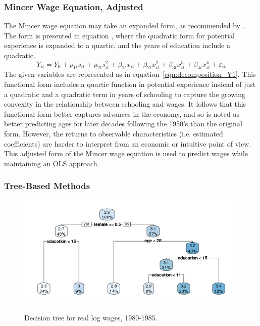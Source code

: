 \documentclass[notitlepage,12pt]{article}
\newcommand{\1}[1]{\ensuremath{\mathbb{1}\left( #1 \right)}}               %
\begin{document}
\subsubsection{Mincer Wage Equation, Adjusted}
The Mincer wage equation may take an expanded form, as recommended by \cite{lemieux2006mincer}.  The form is presented in equation 
\label{eqn:decomposition_Y2}, where the quadratic form for potential experience is expanded to a quartic, and the years of education include a quadratic.  
\begin{equation}
  Y_{it}  = Y_0 + \rho_{1t} s_{it} + \rho_{2t} s_{it}^2 + \beta_{1t} x_{it} + \beta_{2t} x_{it}^2 + \beta_{3t} x_{it}^3 + \beta_{4t} x_{it}^4 + \varepsilon_{it}
\end{equation}
The given variables are represented as in equation~\eqref{eqn:decomposition_Y1}.
This functional form includes a quartic function in potential experience instead of just a quadratic and a quadratic term in years of schooling to capture the growing convexity in the relationship between schooling and wages.  It follows that this functional form better captures advances in the economy, and so is noted as better predicting ages for later decades following the 1950's than the original form.  However, the returns to observable characteristics (i.e. estimated coefficients) are harder to interpret from an economic or intuitive point of view.  This adjusted form of the Mincer wage equation is used to predict wages while maintaining an OLS approach.

\subsubsection{Tree-Based Methods}
\begin{figure}[H]
  \centering
  \caption{Decision tree for real log wages, 1980-1985.}
  \includegraphics[width=\textwidth]{figures/Rpat1980_1985.png}
  \label{fig:decisiontree_1980_1985}
\end{figure}
\end{document}
